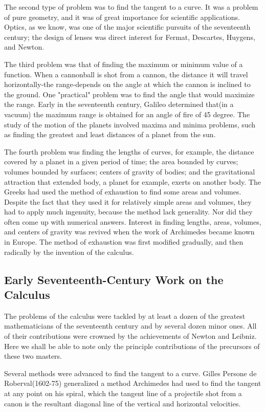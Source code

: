 \documentclass[a4paper,12pt]{article} %
\begin{document}
The second type of problem was to find the tangent to a curve.
It was a problem of pure geometry, and it was of great importance 
for scientific applications. Optics, as we know, was one of the major scientific pursuits of the seventeenth century; the design of lenses was direct interest for Fermat, Descartes, Huygens, and Newton.

The third problem was that of finding the maximum or minimum 
value of a function. When a cannonball is shot from a cannon, the distance it will travel horizontally-the range-depends on the angle at which the cannon is inclined to the ground. One "practical" problem was to find the angle that would maximize the range. Early in the seventeenth century, Galileo determined that(in a vacuum) the maximum range is obtained for an angle of fire of 45 degree. The study of the motion of the planets 
involved maxima and minima problems, such as finding the 
greatest and least distances of a planet from the sun.

The fourth problem was finding the lengths of curves, for 
example, the distance covered by a planet in a given period 
of time; the area bounded by curves; volumes bounded by 
surfaces; centers of gravity of bodies; and the gravitational 
attraction that extended body, a planet for example, exerts on 
another body. The Greeks had used the method of exhaustion to find some areas and volumes. Despite the fact that they used it for relatively simple areas and volumes, they had to apply much ingenuity, because the method lack generality. Nor did they often come up with numerical answers. Interest in finding lengths, areas, volumes, and centers of gravity was revived when the work of Archimedes became known in Europe. The method of exhaustion was first modified gradually, and then radically by the invention of the calculus.

\subsection{Early Seventeenth-Century Work on the Calculus}

The problems of the calculus were tackled by at least a dozen 
of the greatest mathematicians of the seventeenth century and 
by several dozen minor ones. All of their contributions were 
crowned by the achievements of Newton and Leibniz. Here we shall 
be able to note only the principle contributions of the precursors 
of these two masters.

Several methods were advanced to find the tangent to a curve.
Gilles Persone de Roberval(1602-75) generalized a method Archimedes 
had used to find the tangent at any point on his spiral, which 
the tangent line of a projectile shot from a canon is the resultant 
diagonal line of the vertical and horizontal velocities.
\end{document}
